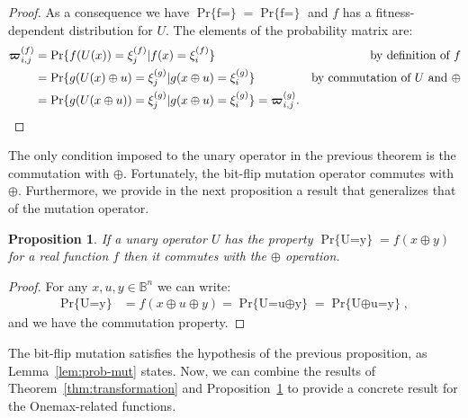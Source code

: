 \documentclass{article}
\newtheorem{proposition}{Proposition}
\def\vec#1{\mathchoice{\mbox{\boldmath$\displaystyle#1$}}
  {\mbox{\boldmath$\textstyle#1$}}
  {\mbox{\boldmath$\scriptstyle#1$}}
  {\mbox{\boldmath$\scriptscriptstyle#1$}}}
\newcommand{\Bo}[0]{\mathbb{B}}
\newcommand{\Prob}[1]{\mathop{\mathrm{Pr}\{#1\}}}
\newcommand{\ProbCond}[2]{\mathop{\mathrm{Pr}\{#1|#2\}}}
\begin{document}
\begin{proof}
As a consequence we have $\Prob{f(U(x))=\xi_j^{(f)}} = \Prob{f(U(y))=\xi_j^{(f)}}$ and $f$ has a fitness-dependent distribution for $U$. The elements of the probability matrix are:
\begin{align}
\vec{\varpi}^{(f)}_{i,j} &= \ProbCond{f(U(x))=\xi_j^{(f)}}{f(x)=\xi_i^{(f)}} & \text{by definition of $f$} \nonumber \\
&= \ProbCond{g(U(x)\oplus u)=\xi_{j}^{(g)}}{g(x\oplus u)=\xi_{i}^{(g)}} & \text{by commutation of $U$ and $\oplus$} \nonumber \\
&= \ProbCond{g(U(x \oplus u))=\xi_{j}^{(g)}}{g(x \oplus u)=\xi_{i}^{(g)}} = \vec{\varpi}^{(g)}_{i,j}.
\end{align}


\end{proof}

The only condition imposed to the unary operator in the previous theorem is the commutation with $\oplus$. Fortunately, the bit-flip mutation operator commutes with $\oplus$. Furthermore, we provide in the next proposition a result that generalizes that of the mutation operator.

\begin{proposition}
\label{prop:commutation}
If a unary operator $U$ has the property $\Prob{U(x)=y}=f(x\oplus y)$ for a real function $f$ then it commutes with the $\oplus$ operation.
\end{proposition}
\begin{proof}
For any $x,u,y \in \Bo^n$ we can write:
\begin{align}
\Prob{U(x\oplus u)=y} &= f(x \oplus u \oplus y) = \Prob{U(x) = u \oplus y} =\Prob{U(x)\oplus u= y} ,
\end{align}
and we have the commutation property.
\end{proof}

The bit-flip  mutation satisfies the hypothesis of the previous proposition, as Lemma~\ref{lem:prob-mut} states.
Now, we can combine the results of Theorem~\ref{thm:transformation} and Proposition~\ref{prop:commutation} to provide a concrete result for the Onemax-related functions.
\end{document}
